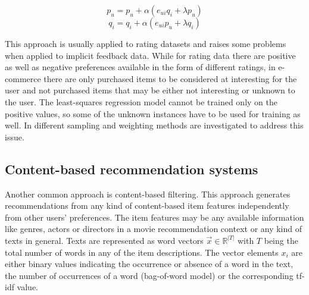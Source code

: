 \documentclass[10pt]{reportMaster}
\begin{document}
\begin{equation}
	p_u = p_u + \alpha (e_{ui} q_i + \lambda p_u)
\end{equation}
\begin{equation}
	q_i = q_i + \alpha (e_{ui} p_u + \lambda q_i)
\end{equation}

This approach is usually applied to rating datasets and raises some problems when applied to implicit feedback data.
While for rating data there are positive as well as negative preferences available in the form of different ratings, in e-commerce there are only purchased items to be considered at interesting for the user and not purchased items that may be either not interesting or unknown to the user.
The least-squares regression model cannot be trained only on the positive values, so some of the unknown instances have to be used for training as well.
In \cite{occf} different sampling and weighting methods are investigated to address this issue. %






\subsection{Content-based recommendation systems}
\label{rs_cb}

Another common approach is content-based filtering.
This approach generates recommendations from any kind of content-based item features independently from other users' preferences.
The item features may be any available information like genres, actors or directors in a movie recommendation context or any kind of texts in general.
Texts are represented as word vectors $\vec{x} \in \mathds{R}^{|T|}$ with $T$ being the total number of words in any of the item descriptions.
The vector elements $x_i$ are either binary values indicating the occurrence or absence of a word in the text, the number of occurrences of a word (bag-of-word model) or the corresponding tf-idf value. %
\end{document}
